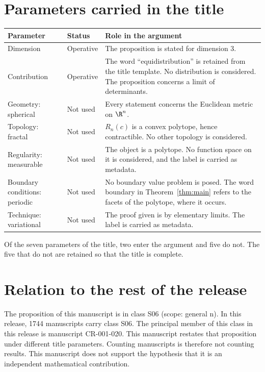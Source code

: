 \documentclass[11pt]{article}
\begin{document}
\section{Parameters carried in the title}\label{sec:params}
\begin{center}
\small
\begin{tabular}{p{}p{}p{}}
\toprule
Parameter & Status & Role in the argument \\
\midrule
Dimension & Operative & The proposition is stated for dimension $3$. \\
Contribution & Operative & The word ``equidistribution'' is retained from the title template. No distribution is considered. The proposition concerns a limit of determinants. \\
Geometry: spherical & Not used & Every statement concerns the Euclidean metric on $\R^n$. \\
Topology: fractal & Not used & $R_n(c)$ is a convex polytope, hence contractible. No other topology is considered. \\
Regularity: measurable & Not used & The object is a polytope. No function space on it is considered, and the label is carried as metadata. \\
Boundary conditions: periodic & Not used & No boundary value problem is posed. The word boundary in Theorem~\ref{thm:main} refers to the facets of the polytope, where it occurs. \\
Technique: variational & Not used & The proof given is by elementary limits. The label is carried as metadata. \\
\bottomrule
\end{tabular}
\end{center}
Of the seven parameters of the title, two enter the argument and five do not. The five that do not are retained so that the title is complete.

\section{Relation to the rest of the release}
The proposition of this manuscript is in class S06 (scope: general n).
In this release, 1744 manuscripts carry class S06. The principal member of this class in this release is manuscript CR-001-020. This manuscript restates that proposition under different title parameters.
Counting manuscripts is therefore not counting results. This manuscript does not support the hypothesis that it is an independent mathematical contribution.
\end{document}
